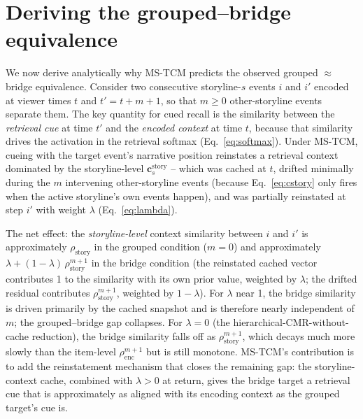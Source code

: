 \documentclass[10pt]{article}
\newcommand{\cstory}{\mathbf{c}^{\mathrm{story}}}
\newcommand{\rhoenc}{\rho_{\mathrm{enc}}}
\newcommand{\rhostory}{\rho_{\mathrm{story}}}
\begin{document}
\section{Deriving the grouped--bridge equivalence}
\label{sec:eqv}

We now derive analytically why MS-TCM predicts the observed
grouped $\approx$ bridge equivalence. Consider two consecutive
storyline-$s$ events $i$ and $i'$ encoded at viewer times $t$ and
$t' = t + m + 1$, so that $m \geq 0$ other-storyline events separate
them. The key quantity for cued recall is the similarity between the
\emph{retrieval cue} at time $t'$ and the \emph{encoded context} at
time $t$, because that similarity drives the activation in the
retrieval softmax (Eq.~\ref{eq:softmax}). Under MS-TCM, cueing with
the target event's narrative position reinstates a retrieval context
dominated by the storyline-level $\cstory_s$ -- which was cached at
$t$, drifted minimally during the $m$ intervening other-storyline
events (because Eq.~\ref{eq:cstory} only fires when the active
storyline's own events happen), and was partially reinstated at step
$i'$ with weight $\lambda$ (Eq.~\ref{eq:lambda}).

The net effect: the \emph{storyline-level} context similarity between
$i$ and $i'$ is approximately $\rhostory$ in the grouped condition
($m = 0$) and approximately $\lambda + (1-\lambda)\,\rhostory^{m+1}$
in the bridge condition (the reinstated cached vector contributes 1 to
the similarity with its own prior value, weighted by $\lambda$; the
drifted residual contributes $\rhostory^{m+1}$, weighted by
$1-\lambda$). For $\lambda$ near 1, the bridge similarity is driven
primarily by the cached snapshot and is therefore nearly independent
of $m$; the grouped--bridge gap collapses. For $\lambda = 0$ (the
hierarchical-CMR-without-cache reduction), the bridge similarity falls
off as $\rhostory^{m+1}$, which decays much more slowly than the
item-level $\rhoenc^{m+1}$ but is still monotone. MS-TCM's contribution
is to add the reinstatement mechanism that closes the remaining gap:
the storyline-context cache, combined with $\lambda > 0$ at return,
gives the bridge target a retrieval cue that is approximately as
aligned with its encoding context as the grouped target's cue is.
\end{document}
